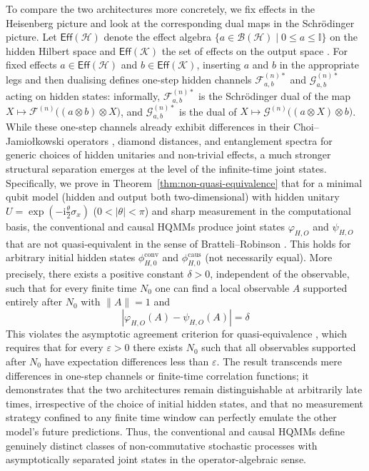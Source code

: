 \documentclass[11pt, reco]{article}
\begin{document}
To compare the two architectures more concretely, we fix effects in the Heisenberg picture and look at the corresponding dual maps in the Schr\"odinger picture. Let $\mathsf{Eff}(\mathcal{H})$ denote the effect algebra $\{a\in\mathcal{B}(\mathcal{H})\mid 0\le a\le\mathbb{I}\}$ on the hidden Hilbert space and $\mathsf{Eff}(\mathcal{K})$ the set of effects on the output space \cite{MilP07, Kraus83}. For fixed effects $a\in\mathsf{Eff}(\mathcal{H})$ and $b\in\mathsf{Eff}(\mathcal{K})$, inserting $a$ and $b$ in the appropriate legs and then dualising defines one-step hidden channels $\mathcal{F}_{a,b}^{(n)*}$ and $\mathcal{G}_{a,b}^{(n)*}$ acting on hidden states: informally, $\mathcal{F}_{a,b}^{(n)*}$ is the Schr\"odinger dual of the map $X\mapsto\mathcal{F}^{(n)}\bigl((a\otimes b)\otimes X\bigr)$, and $\mathcal{G}_{a,b}^{(n)*}$ is the dual of $X\mapsto\mathcal{G}^{(n)}\bigl((a\otimes X)\otimes b\bigr)$. While these one-step channels already exhibit differences in their Choi–Jamio{\l}kowski operators \cite{Jam72, Choi75}, diamond distances, and entanglement spectra for generic choices of hidden unitaries and non-trivial effects, a much stronger structural separation emerges at the level of the infinite-time joint states. Specifically, we prove in Theorem~\ref{thm:non-quasi-equivalence} that for a minimal qubit model (hidden and output both two-dimensional) \cite{G23, GMM25, YILSDH15} with hidden unitary $U = \exp(-\mathrm{i}\frac{\theta}{2}\sigma_x)$ ($0<|\theta|<\pi$) and sharp measurement in the computational basis, the conventional and causal HQMMs produce joint states $\varphi_{H,O}$ and $\psi_{H,O}$ that are not quasi-equivalent in the sense of Bratteli–Robinson \cite{BR}. This holds for arbitrary initial hidden states $\phi_{H,0}^{\mathrm{conv}}$ and $\phi_{H,0}^{\mathrm{caus}}$ (not necessarily equal). More precisely, there exists a positive constant $\delta > 0$, independent of the observable, such that for every finite time $N_0$ one can find a local observable $A$ supported entirely after $N_0$ with $\|A\| = 1$ and
\begin{equation*}
|\varphi_{H,O}(A) - \psi_{H,O}(A)| = \delta
\end{equation*}
This violates the  asymptotic agreement criterion for quasi-equivalence \cite{BR}, which requires that for every $\varepsilon > 0$ there exists $N_0$ such that all observables supported after $N_0$ have expectation differences less than $\varepsilon$. The result transcends mere differences in one-step channels or finite-time correlation functions; it demonstrates that the two architectures remain distinguishable at arbitrarily late times, irrespective of the choice of initial hidden states, and that no measurement strategy confined to any finite time window can perfectly emulate the other model's future predictions. Thus, the conventional and causal HQMMs define genuinely distinct classes of non-commutative stochastic processes with asymptotically separated joint states in the operator-algebraic sense.
\end{document}
